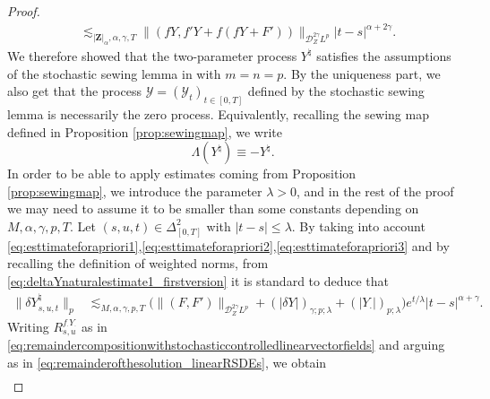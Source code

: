 \documentclass[11pt,a4paper]{article}
\theoremstyle{plain}
\begin{document}
\begin{proof}
\begin{equation}
\begin{aligned}
        &\lesssim_{|\mathbf{Z}|_\alpha,\alpha,\gamma,T} \|(f Y,f'Y+f(f Y+F'))\|_{\mathscr{D}_Z^{2\gamma}L^p} |t-s|^{\alpha+2\gamma}.
    \end{aligned}
    \end{equation}
    We therefore showed that the two-parameter process $Y^\natural$ satisfies the assumptions of the stochastic sewing lemma in \cite[Theorem 2.9]{FHL21} 
    with $m=n=p$. By the uniqueness part, we also get that the process $\mathcal{Y}=(\mathcal{Y}_t)_{t\in [0,T]}$ defined by the stochastic sewing lemma is necessarily the zero process. Equivalently, recalling the sewing map defined in Proposition \ref{prop:sewingmap}, we write \begin{equation}\label{eq:sewingofynatural}\Lambda(Y^\natural) \equiv -Y^\natural.\end{equation} 
    In order to be able to apply estimates coming from Proposition \ref{prop:sewingmap}, we introduce the parameter $\lambda>0$, and in the rest of the proof we may need to assume it to be smaller than some constants depending on $M,\alpha,\gamma,p,T$.
    Let $(s,u,t) \in \Delta^2_{[0,T]}$ with $|t-s|\le \lambda$. 
    By taking into account \eqref{eq:esttimateforapriori1},\eqref{eq:esttimateforapriori2},\eqref{eq:esttimateforapriori3} and by recalling the definition of weighted norms, from \eqref{eq:deltaYnaturalestimate1_firstversion} it is standard to deduce that 
    \begin{equation} \label{eq:deltaYnaturalestimate1}
        \begin{aligned}
            \|\delta Y^\natural_{s,u,t}\|_p 
            &\lesssim_{M,\alpha,\gamma,p,T} \big( \|(F,F')\|_{\mathscr{D}^{2\gamma}_ZL^{p}}  + (|\delta Y|)_{\gamma;p;\lambda} + (|Y_\cdot|)_{p;\lambda} \big) e^{t/\lambda} |t-s|^{\alpha+\gamma}.
        \end{aligned}
    \end{equation} 
    Writing $R_{s,u}^{f_\cdot Y_\cdot}$ as in \eqref{eq:remaindercompositionwithstochasticcontrolledlinearvectorfields} and arguing as in \eqref{eq:remainderofthesolution_linearRSDEs}, we obtain \begin{equation*}\begin{aligned}

\end{aligned}
\end{equation*}
\end{proof}
\end{document}
